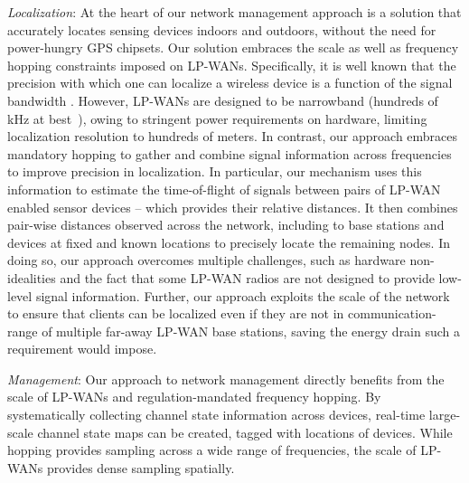 \emph{Localization}: At the heart of our network management approach is a solution that accurately locates sensing devices indoors and outdoors, without the need for power-hungry GPS chipsets. Our solution embraces the scale as well as frequency hopping constraints imposed on LP-WANs. Specifically, it is well known that the precision with which one can localize a wireless device is a function of the signal bandwidth \cite{Krizman1997}. However, LP-WANs are designed to be narrowband (hundreds of kHz at best~\cite{alliance2015lorawan}), owing to stringent power requirements on hardware, limiting localization resolution to hundreds of meters. In contrast, our approach embraces mandatory hopping  to gather 
and combine signal information across frequencies to improve precision in localization. In particular, our mechanism uses this information to estimate the time-of-flight of signals between pairs of LP-WAN enabled sensor devices -- which provides their relative distances. It then combines pair-wise distances observed across the network, including to base stations and devices at fixed and known locations to precisely locate the remaining nodes. In doing so, our approach overcomes multiple challenges, such as hardware non-idealities and the fact that some LP-WAN radios are not designed to provide low-level signal information. Further, our approach exploits the scale of the network to ensure that clients can be localized even if they are not in communication-range of multiple far-away LP-WAN base stations, saving the energy drain such a requirement would impose. 




\emph{Management}: Our approach to network management directly benefits from the scale of LP-WANs and regulation-mandated frequency hopping. By systematically collecting channel state information across devices, real-time large-scale channel state maps can be created, tagged with locations of devices.  While hopping provides sampling across a wide range of frequencies, the scale of LP-WANs provides dense sampling spatially. 

